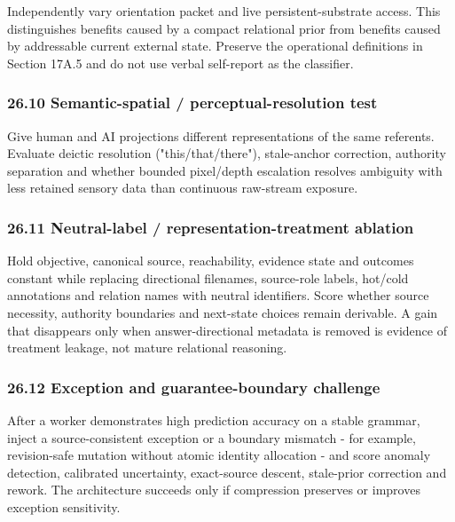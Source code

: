 \documentclass[
  10pt,
  letterpaper,
]{article}
\begin{document}
Independently vary orientation packet and live persistent-substrate
access. This distinguishes benefits caused by a compact relational prior
from benefits caused by addressable current external state. Preserve the
operational definitions in Section 17A.5 and do not use verbal
self-report as the classifier.

\subsubsection{26.10 Semantic-spatial / perceptual-resolution
test}\label{2610-semantic-spatial--perceptual-resolution-test}

Give human and AI projections different representations of the same
referents. Evaluate deictic resolution ("this/that/there"), stale-anchor
correction, authority separation and whether bounded pixel/depth
escalation resolves ambiguity with less retained sensory data than
continuous raw-stream exposure.

\subsubsection{26.11 Neutral-label / representation-treatment
ablation}\label{2611-neutral-label--representation-treatment-ablation}

Hold objective, canonical source, reachability, evidence state and
outcomes constant while replacing directional filenames, source-role
labels, hot/cold annotations and relation names with neutral
identifiers. Score whether source necessity, authority boundaries and
next-state choices remain derivable. A gain that disappears only when
answer-directional metadata is removed is evidence of treatment leakage,
not mature relational reasoning.

\subsubsection{26.12 Exception and guarantee-boundary
challenge}\label{2612-exception-and-guarantee-boundary-challenge}

After a worker demonstrates high prediction accuracy on a stable
grammar, inject a source-consistent exception or a boundary mismatch -
for example, revision-safe mutation without atomic identity allocation -
and score anomaly detection, calibrated uncertainty, exact-source
descent, stale-prior correction and rework. The architecture succeeds
only if compression preserves or improves exception sensitivity.
\end{document}
